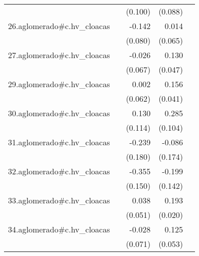 {\begin{longtable}{l*{4}{D{.}{.}{-1}}}
            &                     &     (0.100)         &     (0.088)         &                     \\
\addlinespace
26.aglomerado#c.hv\_cloacas&                     &      -0.142         &       0.014         &                     \\
            &                     &     (0.080)         &     (0.065)         &                     \\
\addlinespace
27.aglomerado#c.hv\_cloacas&                     &      -0.026         &       0.130\sym{**} &                     \\
            &                     &     (0.067)         &     (0.047)         &                     \\
\addlinespace
29.aglomerado#c.hv\_cloacas&                     &       0.002         &       0.156\sym{***}&                     \\
            &                     &     (0.062)         &     (0.041)         &                     \\
\addlinespace
30.aglomerado#c.hv\_cloacas&                     &       0.130         &       0.285\sym{**} &                     \\
            &                     &     (0.114)         &     (0.104)         &                     \\
\addlinespace
31.aglomerado#c.hv\_cloacas&                     &      -0.239         &      -0.086         &                     \\
            &                     &     (0.180)         &     (0.174)         &                     \\
\addlinespace
32.aglomerado#c.hv\_cloacas&                     &      -0.355\sym{*}  &      -0.199         &                     \\
            &                     &     (0.150)         &     (0.142)         &                     \\
\addlinespace
33.aglomerado#c.hv\_cloacas&                     &       0.038         &       0.193\sym{***}&                     \\
            &                     &     (0.051)         &     (0.020)         &                     \\
\addlinespace
34.aglomerado#c.hv\_cloacas&                     &      -0.028         &       0.125\sym{*}  &                     \\
            &                     &     (0.071)         &     (0.053)         &                     \\

\end{longtable}}
